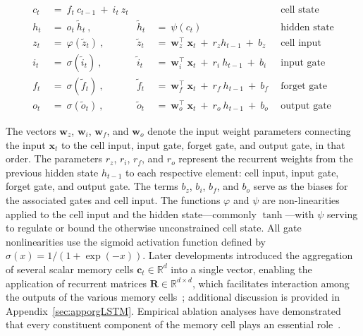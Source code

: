 \begin{align}
c_t \ &= \  f_t \ c_{t-1} \ + \ i_t \ z_t &  & &\text{cell state} \\
h_t  \ &= \ o_t \ \tilde{h}_t \ , & \tilde{h}_t \ &= \ \psi \left( c_t\right)
  &\text{hidden state} \\
z_t \ &= \ \varphi \left( \tilde{z}_t \right) \ , 
  &\tilde{z}_t \ &=  \ \mathbf{w}^\top_{z} \ \mathbf{x}_t \ + \
  r_{z}  h_{t-1} \ + \  b_{z} \ \
  &\text{cell input} \\
i_t \ &= \ \sigma \left( \tilde{i}_t  \right) \ , 
  &\tilde{i}_t \ &= \ \mathbf{w}^\top_{i} \ \mathbf{x}_t \ + \
  r_{i}  \ h_{t-1} \ + \  b_{i} \ \
  &\text{input gate} \\
f_t \ &= \ \sigma \left(  \tilde{f}_t \right) \ , 
  &\tilde{f}_t \ &= \ \mathbf{w}^\top_{f} \ \mathbf{x}_t  \ + \
  r_{f}  \ h_{t-1} \ + \  b_{f} \ \
  &\text{forget gate} \\
o_t \ &= \ \sigma \left( \tilde{o}_t \right) \ , 
  &\tilde{o}_t  \ &= \ \mathbf{w}^\top_{o} \ \mathbf{x}_t \ + \
  r_{o}  \ h_{t-1} \ + \  b_{o} \ \
  &\text{output gate} 
\end{align}

The vectors $\mathbf{w}_{z}$, $\mathbf{w}_{i}$, $\mathbf{w}_{f}$, and $\mathbf{w}_{o}$ denote the input weight parameters connecting the input $\mathbf{x}_t$ to the cell input, input gate, forget gate, and output gate, in that order. The parameters $r_{z}$, $r_{i}$, $r_{f}$, and $r_{o}$ represent the recurrent weights from the previous hidden state $h_{t-1}$ to each respective element: cell input, input gate, forget gate, and output gate. The terms $b_{z}$, $b_{i}$, $b_{f}$, and $b_{o}$ serve as the biases for the associated gates and cell input. The functions $\varphi$ and $\psi$ are non-linearities applied to the cell input and the hidden state—commonly $\tanh$—with $\psi$ serving to regulate or bound the otherwise unconstrained cell state. All gate nonlinearities use the sigmoid activation function defined by $\sigma \left( x \right)= 1/(1+\exp(-x))$. Later developments introduced the aggregation of several scalar memory cells $\mathbf{c}_t \in \mathbb{R}^{d}$ into a single vector, enabling the application of recurrent matrices $\mathbf{R} \in \mathbb{R}^{d \times d}$, which facilitates interaction among the outputs of the various memory cells~\citep{Greff:15}; additional discussion is provided in Appendix~\ref{sec:apporgLSTM}. Empirical ablation analyses have demonstrated that every constituent component of the memory cell plays an essential role~\citep{Greff:15}.

